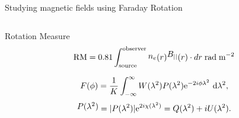 \documentclass[xetex,aspectratio=169]{beamer}
\newcommand{\mypos}[2]{\tikz[remember picture]{\node[inner sep=0pt, anchor=base](#2){#1};}}
\begin{document}
\begin{frame}{Studying magnetic fields using Faraday Rotation}
	\footnotesize
	\begin{columns}

		\begin{column}{0.55\textwidth}



			\begin{block}{Rotation Measure}
				\begin{equation*}
					\mypos{\text{RM}}{rm} = 0.81 \int_{\text{source}}^{\text{observer}} \mypos{$n_e$}{ne}(r) \mypos{$B_{||}$}{be}(r) \cdot dr\; \text{rad}\;\text{m}^{-2}
				\end{equation*}
			\end{block}

			\begin{equation*}
				\label{eq:fourier}
				F(\phi) = \frac{1}{K} \int_{-\infty}^{\infty}{ W(\lambda^2)P(\lambda^2){\rm e}^{-2i\phi \lambda^2}~{\rm d}\lambda^2 },
			\end{equation*}
			\begin{equation*}
				\label{eq:pol}
				\mypos{$P(\lambda^2)$}{ppos} = |P(\lambda^2)|{\rm e}^{2i\chi(\lambda^2)} = Q(\lambda^2) + iU(\lambda^2).
			\end{equation*}
		\end{column}


\end{columns}
\end{frame}
\end{document}
